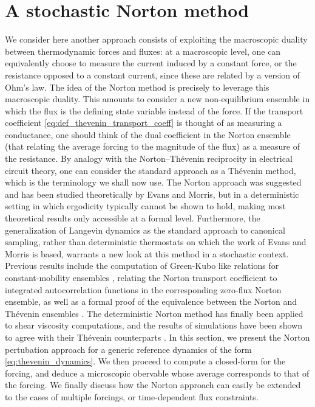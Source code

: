 \documentclass[pdflatex,sn-mathphys]{sn-jnl}%
\theoremstyle{thmstyleone}%
\theoremstyle{thmstyletwo}%
\theoremstyle{thmstylethree}%
\newcommand{\1}{\mathbbm{1}}
\begin{document}
\section{A stochastic Norton method}\label{norton}
We consider here another approach consists of exploiting the macroscopic duality between thermodynamic forces and fluxes: 
at a macroscopic level, one can equivalently choose to measure the current induced by a constant force, or the resistance opposed to a constant current, since these are related by a version of Ohm's law.
The idea of the Norton method is precisely to leverage this macroscopic duality. This amounts to consider a new non-equilibrium ensemble in which the flux is the defining state variable instead of the force. 
If the transport coefficient \eqref{eq:def_thevenin_transport_coeff} is thought of as measuring a conductance, one should think of the dual coefficient in the Norton ensemble (that relating the average forcing to the magnitude of the flux) as a measure of the resistance.
By analogy with the Norton--Th\'evenin reciprocity in electrical circuit theory, one can consider the standard approach as a Th\'evenin method, which is the terminology we shall now use. The Norton approach was suggested and has been studied theoretically by Evans and Morris,  but in a deterministic setting in which ergodicity typically cannot be shown to hold, making most theoretical results only accessible at a formal level.
Furthermore, the generalization of Langevin dynamics as the standard approach to canonical sampling, rather than deterministic thermostats on which the work of Evans and Morris is based, warrants a new look at this method in a stochastic context.
Previous results include the computation of Green-Kubo like relations for constant-mobility ensembles \cite{}, relating the Norton transport coefficient to integrated autocorrelation functions in the corresponding zero-flux Norton ensemble, as well as a formal proof of the equivalence between the Norton and Th\'evenin ensembles \cite{}.
The deterministic Norton method has finally been applied to shear viscosity computations, and the results of simulations have been shown to agree with their Th\'evenin counterparts \cite{}.
In this section, we present the Norton pertubation approach for a generic reference dynamics of the form \eqref{eq:thevenin_dynamics}. We then proceed to compute a closed-form for the forcing, and deduce a microscopic obervable whose average corresponds to that of the forcing. We finally discuss how the Norton approach can easily be extended to the cases of multiple forcings, or time-dependent flux constraints.
\end{document}
